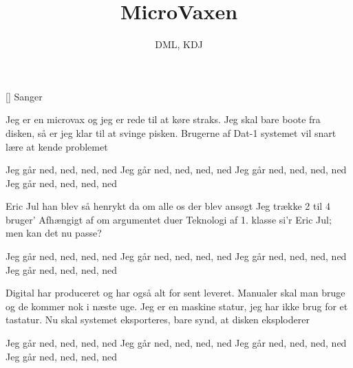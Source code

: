 \documentclass[a4paper,11pt]{article}
\title{MicroVaxen}
\author{DML, KDJ}
\begin{document}
\maketitle

\begin{roles}
[] Sanger
\end{roles}

\begin{song}
Jeg er en microvax
og jeg er rede til at køre straks.
Jeg skal bare boote fra disken,
så er jeg klar til at svinge pisken.
Brugerne af Dat-1 systemet
vil snart lære at kende problemet

Jeg går ned, ned, ned, ned
Jeg går ned, ned, ned, ned
Jeg går ned, ned, ned, ned
Jeg går ned, ned, ned, ned

Eric Jul han blev så henrykt
da om alle os der blev ansøgt
Jeg trække 2 til 4 bruger'
Afhængigt af om argumentet duer
Teknologi af 1. klasse
si'r Eric Jul; men kan det nu passe?

Jeg går ned, ned, ned, ned
Jeg går ned, ned, ned, ned
Jeg går ned, ned, ned, ned
Jeg går ned, ned, ned, ned

Digital har produceret
og har også alt for sent leveret.
Manualer skal man bruge
og de kommer nok i næste uge.
Jeg er en maskine statur,
jeg har ikke brug for et tastatur.
Nu skal systemet eksporteres,
bare synd, at disken eksploderer

Jeg går ned, ned, ned, ned
Jeg går ned, ned, ned, ned
Jeg går ned, ned, ned, ned
Jeg går ned, ned, ned, ned
\end{song}
\end{document}
